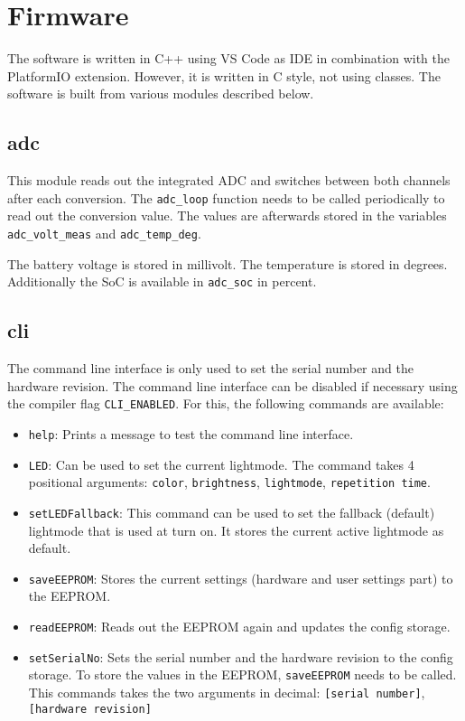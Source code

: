 \section{Firmware}

The software is written in C++ using VS Code as IDE in combination with the PlatformIO extension. However, it is written in C style, not using classes.
The software is built from various modules described below.

\subsection{adc}
This module reads out the integrated ADC and switches between both channels after each conversion. The \texttt{adc\_loop} function needs to be called periodically to read out the conversion value. The values are afterwards stored in the variables \texttt{adc\_volt\_meas} and \texttt{adc\_temp\_deg}. 

The battery voltage is stored in millivolt. The temperature is stored in degrees. Additionally the \ac{SoC} is available in \texttt{adc\_soc} in percent. 
\subsection{cli}
The command line interface is only used to set the serial number and the hardware revision. The command line interface can be disabled if necessary using the compiler flag \texttt{CLI\_ENABLED}.
For this, the following commands are available: 
\begin{itemize}
	\item \texttt{help}: Prints a message to test the command line interface. 
	\item \texttt{LED}: Can be used to set the current lightmode. The command takes 4 positional arguments: \texttt{color}, \texttt{brightness}, \texttt{lightmode}, \texttt{repetition time}.
	\item \texttt{setLEDFallback}: This command can be used to set the fallback (default) lightmode that is used at turn on. It stores the current active lightmode as default. 
	\item \texttt{saveEEPROM}: Stores the current settings (hardware and user settings part) to the EEPROM. 
	\item \texttt{readEEPROM}: Reads out the EEPROM again and updates the config storage. 
	\item \texttt{setSerialNo}: Sets the serial number and the hardware revision to the config storage. To store the values in the EEPROM, \texttt{saveEEPROM} needs to be called. This commands takes the two arguments in decimal: \texttt{[serial number]}, \texttt{[hardware revision]}	
\end{itemize}

